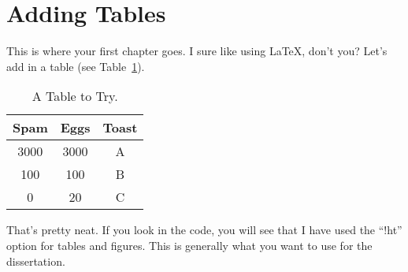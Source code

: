 \section{Adding Tables}
	
This is where your first chapter goes.  I sure like using \LaTeX, don't you?  Let's add in a table (see Table~\ref{tab:table1}).
	
	\begin{table}[!ht]
		\caption{A Table to Try.}
		\label{tab:table1}
		\small
		\centering
		\begin{tabular}{c | c | c}
			Spam   & Eggs  & Toast    \\ \hline
			3000   & 3000  & A \\
			100    & 100   & B \\
			0      & 20    & C
		\end{tabular} 
	\end{table}
	
That's pretty neat.  If you look in the code, you will see that I have used the ``!ht'' option for tables and figures.  This is generally what you want to use for the dissertation.
